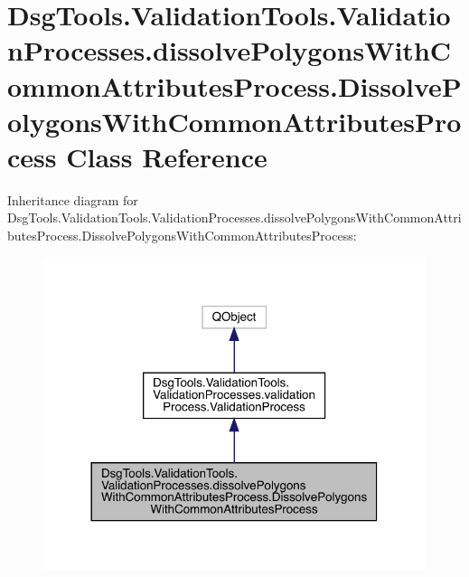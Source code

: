 \hypertarget{class_dsg_tools_1_1_validation_tools_1_1_validation_processes_1_1dissolve_polygons_with_common_a230ae60d63e86f39f6dd689e1f92a46f}{}\section{Dsg\+Tools.\+Validation\+Tools.\+Validation\+Processes.\+dissolve\+Polygons\+With\+Common\+Attributes\+Process.\+Dissolve\+Polygons\+With\+Common\+Attributes\+Process Class Reference}
\label{class_dsg_tools_1_1_validation_tools_1_1_validation_processes_1_1dissolve_polygons_with_common_a230ae60d63e86f39f6dd689e1f92a46f}


Inheritance diagram for Dsg\+Tools.\+Validation\+Tools.\+Validation\+Processes.\+dissolve\+Polygons\+With\+Common\+Attributes\+Process.\+Dissolve\+Polygons\+With\+Common\+Attributes\+Process\+:
\nopagebreak
\begin{figure}[H]
\begin{center}
\leavevmode
\includegraphics[width=317pt]{class_dsg_tools_1_1_validation_tools_1_1_validation_processes_1_1dissolve_polygons_with_common_a4a436ed8e4d88a05d5eb6f7d5b379f5e}
\end{center}
\end{figure}


